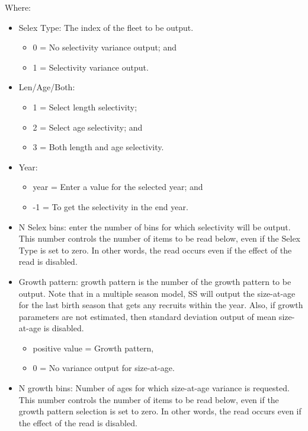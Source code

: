 Where:
\begin{itemize}
	\item Selex Type:  The index of the fleet to be output. 
	\begin{itemize} 
		\item 0 = No selectivity variance output; and
		\item 1 = Selectivity variance output.
	\end{itemize} 
	
	\item Len/Age/Both:  
	\begin{itemize}
		\item 1 = Select length selectivity; 
		\item 2 = Select age selectivity; and
		\item 3 = Both length and age selectivity.
	\end{itemize} 
	
	\item Year:  
	\begin{itemize}
		\item year = Enter a value for the selected year; and
		\item -1  = To get the selectivity in the end year.
	\end{itemize} 

	\item 	N Selex bins: enter the number of bins for which selectivity will be output. This number controls the number of items to be read below, even if the Selex Type is set to zero. In other words, the read occurs even if the effect of the read is disabled. 
	
	\item Growth pattern: growth pattern is the number of the growth pattern to be output. Note that in a multiple season model, SS will output the size-at-age for the last birth season that gets any recruits within the year. Also, if growth parameters are not estimated, then standard deviation output of mean size-at-age is disabled. 
	\begin{itemize}
		\item positive value = Growth pattern,
		\item 0 =  No variance output for size-at-age.   
	\end{itemize}

	\item 	N growth bins:  Number of ages for which size-at-age variance is requested.  This number controls the number of items to be read below, even if the growth pattern selection is set to zero.   In other words, the read occurs even if the effect of the read is disabled.
	

\end{itemize}
